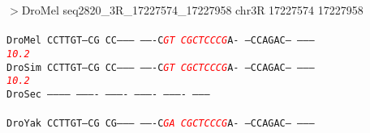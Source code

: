 \documentclass[11pt,twoside,reqno,a4paper]{article}
\begin{document}
\noindent
\newlength{\charwidth}$>$DroMel	seq2820\_3R\_17227574\_17227958	chr3R	17227574	17227958 \\
 \\
\texttt{DroMel	CCTTGT---CG	CC--------	-------C\textit{\textcolor{Red}{G}}\textit{\textcolor{Red}{T}}	\textit{\textcolor{Red}{C}}\textit{\textcolor{Red}{G}}\textit{\textcolor{Red}{C}}\textit{\textcolor{Red}{T}}\textit{\textcolor{Red}{C}}\textit{\textcolor{Red}{C}}\textit{\textcolor{Red}{C}}\textit{\textcolor{Red}{G}}A-	--CCAGAC--	---------\\
\hspace*{7\charwidth}\hspace*{1\charwidth}\hspace*{1\charwidth}\hspace*{29\charwidth}\textit{\textcolor{Red}{10.2}}\hspace*{1\charwidth}\hspace*{1\charwidth}\hspace*{1\charwidth}\\
DroSim	CCTTGT---CG	CC--------	-------C\textit{\textcolor{Red}{G}}\textit{\textcolor{Red}{T}}	\textit{\textcolor{Red}{C}}\textit{\textcolor{Red}{G}}\textit{\textcolor{Red}{C}}\textit{\textcolor{Red}{T}}\textit{\textcolor{Red}{C}}\textit{\textcolor{Red}{C}}\textit{\textcolor{Red}{C}}\textit{\textcolor{Red}{G}}A-	--CCAGAC--	---------\\
\hspace*{7\charwidth}\hspace*{1\charwidth}\hspace*{1\charwidth}\hspace*{29\charwidth}\textit{\textcolor{Red}{10.2}}\hspace*{1\charwidth}\hspace*{1\charwidth}\hspace*{1\charwidth}\\
DroSec	-----------	----------	----------	----------	----------	---------\\
\hspace*{7\charwidth}\hspace*{1\charwidth}\hspace*{1\charwidth}\hspace*{1\charwidth}\hspace*{1\charwidth}\hspace*{1\charwidth}\\
DroYak	CCTTGT---CG	CG--------	-------C\textit{\textcolor{Red}{G}}\textit{\textcolor{Red}{A}}	\textit{\textcolor{Red}{C}}\textit{\textcolor{Red}{G}}\textit{\textcolor{Red}{C}}\textit{\textcolor{Red}{T}}\textit{\textcolor{Red}{C}}\textit{\textcolor{Red}{C}}\textit{\textcolor{Red}{C}}\textit{\textcolor{Red}{G}}A-	--CCAGAC--	---------\\
}
\end{document}
